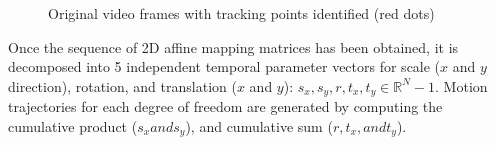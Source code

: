\documentclass{article} %
\begin{document}
\begin{figure}[h]
  \caption{Original video frames with tracking points identified (red dots)}
  \label{fig:trackedfeatures}
\end{figure}

Once the sequence of 2D affine mapping matrices has been obtained, it is decomposed into 5 independent temporal parameter vectors for scale ($x$ and $y$ direction), rotation, and translation ($x$ and $y$): $s_x, s_y, r, t_x, t_y \in \mathbb{R}^N-1$. Motion trajectories for each degree of freedom are generated by computing the cumulative product ($s_x and s_y$), and cumulative sum ($r, t_x, and t_y$).
\end{document}
